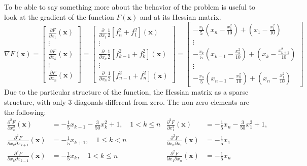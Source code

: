 To be able to say something more about the behavior of the problem is useful to look at the gradient of the function $F(\mathbf{x})$ and at its Hessian matrix.
\begin{equation*}
    \nabla F(\mathbf{x}) = 
    \begin{bmatrix}
        \frac{\partial F}{\partial x_1}(\mathbf{x}) \\
        \vdots \\
        \frac{\partial F}{\partial x_k}(\mathbf{x}) \\
        \vdots \\
        \frac{\partial F}{\partial x_n}(\mathbf{x})
    \end{bmatrix}
    =
    \begin{bmatrix}
        \frac{\partial}{\partial x_1} \frac{1}{2}\left[f_n^2 + f_1^2\right] (\mathbf{x})\\
        \vdots \\
        \frac{\partial}{\partial x_k} \frac{1}{2}\left[f_{k-1}^2 + f_k^2\right] (\mathbf{x})\\
        \vdots \\
        \frac{\partial}{\partial x_n}  \frac{1}{2}\left[f_{n-1}^2 + f_n^2\right] (\mathbf{x})
    \end{bmatrix}
    =
    \begin{bmatrix}
        -\frac{x_1}{5}\left(x_n - \frac{x_1^2}{10}\right) + \left(x_1 - \frac{x_1^2}{10}\right) \\
        \vdots \\
        -\frac{x_k}{5}\left(x_{k-1} - \frac{x_k^2}{10}\right) + \left(x_k - \frac{x_{k+1}^2}{10}\right) \\
        \vdots \\
        -\frac{x_n}{5}\left(x_{n-1} - \frac{x_n^2}{10}\right) + \left(x_n - \frac{x_1^2}{10}\right)
    \end{bmatrix}
\end{equation*}
Due to the particular structure of the function, the Hessian matrix as a sparse structure, with only 3 diagonals different from zero. The non-zero elements are the following:
\begin{align*}
    \frac{\partial^2 F}{\partial x_k^2} (\mathbf{x}) &= -\frac{1}{5}x_{k-1} - \frac{3}{50}x_k^2  + 1, \quad 1 < k \leq n  &
    \frac{\partial^2 F}{\partial x_1^2} (\mathbf{x}) &= -\frac{1}{5}x_{n} - \frac{3}{50}x_1^2  + 1, \\
    \frac{\partial^2 F}{\partial x_k \partial x_{k+1}} (\mathbf{x}) &= -\frac{1}{5}x_{k+1}, \quad 1 \leq k < n  &
    \frac{\partial^2 F}{\partial x_n \partial x_1}(\mathbf{x}) &= -\frac{1}{5}x_1  \\
    \frac{\partial^2 F}{\partial x_k \partial x_{k-1}}(\mathbf{x}) &= -\frac{1}{5}x_{k}, \quad 1 < k \leq n  &
    \frac{\partial^2 F}{\partial x_1 \partial x_{n}}(\mathbf{x}) &= -\frac{1}{5}x_{n}
\end{align*}
